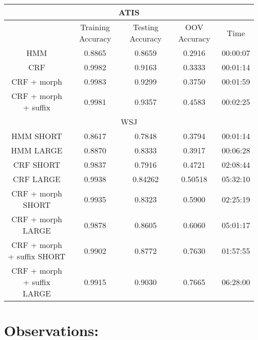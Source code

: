 \documentclass[10pt] {article}
\begin{document}
\begin{center}
\begin{tabular}{| c || c | c | c | c | } 
\hline
    \multicolumn{5}{|c|}{ATIS} \\       \hline    
\hline
  			& Training Accuracy  & Testing Accuracy 	& OOV Accuracy & Time\\ \hline
HMM				&0.8865	& 0.8659	&	0.2916	& 00:00:07 \\ \hline
CRF 					&0.9982	&0.9163	& 0.3333		& 00:01:14	 \\ \hline 	
CRF + morph 			&0.9983	&0.9299	& 0.3750		& 00:01:59	 \\ \hline 	
CRF + morph + suffix 	&0.9981	&0.9357	& 0.4583		& 00:02:25	 \\ \hline 	

    \multicolumn{5}{|c|}{WSJ } \\       \hline    
HMM SHORT					&0.8617	&0.7848	& 0.3794		& 00:01:14	 \\ \hline 	
HMM LARGE					&0.8870	&0.8333	& 0.3917 		& 00:06:28	 \\ \hline
CRF SHORT 					&0.9837	&0.7916	& 0.4721		& 02:08:44	 \\ \hline 	
CRF LARGE 					&0.9938	&0.84262	&0.50518 		& 05:32:10	\\ \hline
CRF + morph SHORT 			&0.9935	&0.8323	& 0.5900		& 02:25:19	 \\ \hline 	
CRF + morph LARGE 			&0.9878	&0.8605	& 0.6060 		& 05:01:17  	\\ \hline
CRF + morph + suffix SHORT		&0.9902	&0.8772	& 0.7630		& 01:57:55	\\ \hline 	
CRF + morph + suffix LARGE		&0.9915	&0.9030	& 0.7665 		& 06:28:00 	\\ \hline
  \end{tabular}
\end{center}

\section{Observations:}
\end{document}
